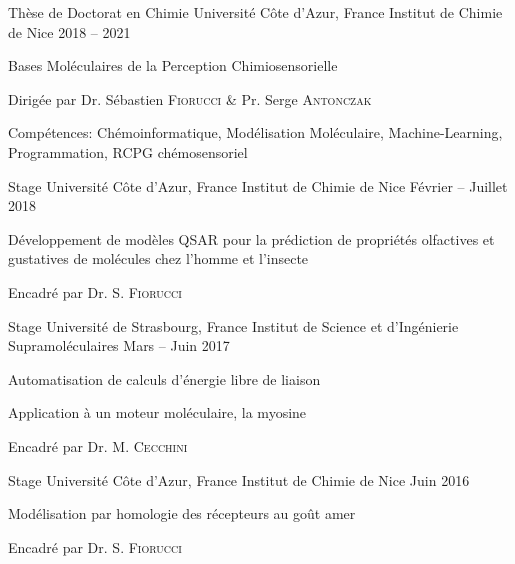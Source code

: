 \vspace{-1em}

\begin{minipage}[t]{.49\linewidth}\vspace{-1pt}
    \vspace{-2pt}
% 
    \begin{cventries}
% 
        \cventryvar
            {Thèse de Doctorat en Chimie}
            {Université Côte d'Azur, France}
            {Institut de Chimie de Nice}
            {2018 -- 2021}
            {
            \begin{cvitems}
                \item{Bases Moléculaires de la Perception Chimiosensorielle}
                \item{Dirigée par Dr. Sébastien \textsc{Fiorucci} \& Pr. Serge \textsc{Antonczak}}
                \item{Compétences: Chémoinformatique, Modélisation Moléculaire, Machine-Learning, Programmation, RCPG chémosensoriel}
            \end{cvitems}
            }
%
        \cventryvar
            {Stage}
            {Université Côte d'Azur, France}
            {Institut de Chimie de Nice}
            {Février -- Juillet 2018}
            {
            \begin{cvitems}
                \item{Développement de modèles QSAR pour la prédiction de propriétés olfactives et gustatives de molécules chez l'homme et l'insecte}
                \item{Encadré par Dr. S. \textsc{Fiorucci}}
            \end{cvitems}
            }
%
        \cventryvar
            {Stage}
            {Université de Strasbourg, France}
            {Institut de Science et d'Ingénierie Supramoléculaires}
            {Mars -- Juin 2017}
            {
            \begin{cvitems}
                \item{Automatisation de calculs d'énergie libre de liaison}
                \item{Application à un moteur moléculaire, la myosine}
                \item{Encadré par Dr. M. \textsc{Cecchini}}
            \end{cvitems}
            }
% 
        \cventryvar
            {Stage}
            {Université Côte d'Azur, France}
            {Institut de Chimie de Nice}
            {Juin 2016}
            {
            \begin{cvitems}
                \item{Modélisation par homologie des récepteurs au goût amer}
                \item{Encadré par Dr. S. \textsc{Fiorucci}}
            \end{cvitems}
            }
% 
    \end{cventries}
% 
\end{minipage}\nobreak
